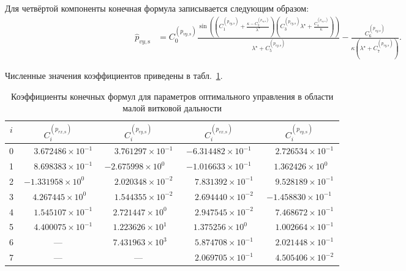 Для четвёртой компоненты конечная формула записывается следующим образом:
\begin{equation}
	\begin{aligned}
		\widehat{p}_{vy,\mathrm{s}}
		&=
		C_0^{(p_{vy,\mathrm{s}})}
		\frac{
			\sin\!\left(
			\left(
			C_1^{(p_{vy,\mathrm{s}})}
			+
			\frac{\kappa-C_2^{(p_{vy,\mathrm{s}})}}{\lambda^\star}
			\right)
			\left(
			C_3^{(p_{vy,\mathrm{s}})}\lambda^\star
			+
			\frac{C_4^{(p_{vy,\mathrm{s}})}}{\kappa}
			\right)
			\right)
		}{
			\lambda^\star+C_5^{(p_{vy,\mathrm{s}})}
		}
		-
		\frac{
			C_6^{(p_{vy,\mathrm{s}})}
		}{
			\kappa\left(\lambda^\star+C_7^{(p_{vy,\mathrm{s}})}\right)
		}.
	\end{aligned}
\end{equation}

Численные значения коэффициентов приведены в табл.~\ref{tab:chap2_s_p_coefficients}.

\begin{table}[htbp]
	\centering
	\caption{Коэффициенты конечных формул для параметров оптимального управления в области малой витковой дальности}
	\label{tab:chap2_s_p_coefficients}
	\begin{tabular}{|c|c|c|c|c|}
		\hline
		$i$ & $C_i^{(p_{rx,\mathrm{s}})}$ & $C_i^{(p_{ry,\mathrm{s}})}$ & $C_i^{(p_{vx,\mathrm{s}})}$ & $C_i^{(p_{vy,\mathrm{s}})}$ \\
		\hline
		0 & $\phantom{-}3.672486\times10^{-1}$ & $\phantom{-}3.761297\times10^{-1}$ & $-6.314482\times10^{-1}$ & $\phantom{-}2.726534\times10^{-1}$ \\
		1 & $\phantom{-}8.698383\times10^{-1}$ & $-2.675998\times10^{0\phantom{-}}$ & $-1.016633\times10^{-1}$ & $\phantom{-}1.362426\times10^{0\phantom{-}}$ \\
		2 & $-1.331958\times10^{0\phantom{-}}$ & $\phantom{-}2.020348\times10^{-2}$ & $\phantom{-}7.831392\times10^{-1}$ & $\phantom{-}9.528189\times10^{-1}$ \\
		3 & $\phantom{-}4.267445\times10^{0\phantom{-}}$ & $\phantom{-}1.544355\times10^{-2}$ & $\phantom{-}2.694440\times10^{-2}$ & $-1.458830\times10^{-1}$ \\
		4 & $\phantom{-}1.545107\times10^{-1}$ & $\phantom{-}2.721447\times10^{0\phantom{-}}$ & $\phantom{-}2.947545\times10^{-2}$ & $\phantom{-}7.468672\times10^{-1}$ \\
		5 & $\phantom{-}4.400075\times10^{-1}$ & $\phantom{-}1.223626\times10^{1\phantom{-}}$ & $\phantom{-}1.375256\times10^{0\phantom{-}}$ & $\phantom{-}1.002664\times10^{-1}$ \\
		6 & --- & $\phantom{-}7.431963\times10^{3\phantom{-}}$ & $\phantom{-}5.874708\times10^{-1}$ & $\phantom{-}2.021448\times10^{-1}$ \\
		7 & --- & --- & $\phantom{-}2.069705\times10^{-1}$ & $\phantom{-}4.505406\times10^{-2}$ \\
		\hline
	\end{tabular}
\end{table}

